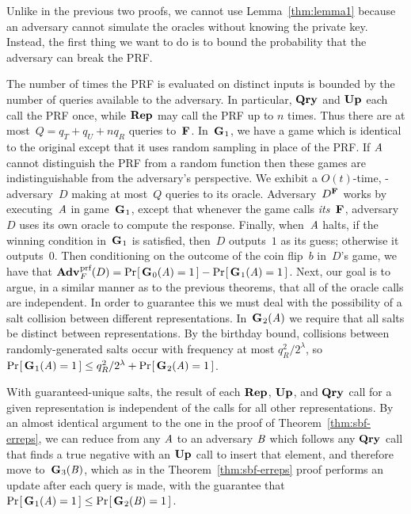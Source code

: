 Unlike in the previous two proofs, we cannot use Lemma~\ref{thm:lemma1} because
an adversary cannot simulate the oracles without knowing the private key. Instead,
the first thing we
want to do is to bound the probability that the adversary can break the PRF.

The number of times the PRF is evaluated on distinct inputs is bounded by the
number of queries available to the adversary. In particular, $\textup{\textbf{Qry}}\hspace{0.5pt}$ and $\textup{\textbf{Up}}\hspace{0.5pt}$
each call the PRF once, while $\textup{\textbf{Rep}}\hspace{0.5pt}$ may call the PRF up to $n$ times. Thus
there are at most~$Q = q_T + q_U + nq_R$
queries to~$\textup{\textbf{F}}\hspace{0.5pt}$.
%
In~$\textup{\textbf{G}}\hspace{0.5pt}_1$, we have a game which is identical to the original except that it
uses
random sampling in place of the PRF. If $\mathit{A}$ cannot distinguish the PRF from
a random function then these games are indistinguishable from the adversary's
perspective.
%
We exhibit a $O(t)$-time, \prf-adversary~$D$ making at most~$Q$ queries to its
oracle. Adversary~$D^{\textup{\textbf{F}}\hspace{0.5pt}}$ works by executing~$\mathit{A}$ in game~$\textup{\textbf{G}}\hspace{0.5pt}_1$, except
that whenever the game calls \emph{its}~$\textup{\textbf{F}}\hspace{0.5pt}$, adversary~$D$ uses its
own oracle to compute the response.
%
Finally, when~$\mathit{A}$ halts, if the winning condition in~$\textup{\textbf{G}}\hspace{0.5pt}_1$ is satisfied,
then~$D$ outputs~$1$ as its guess; otherwise it outputs~$0$.
%
Then conditioning on the outcome of the coin flip~$b$ in~$D$'s game, we have that
$\Adv{\prf}_F(D) = \Prob{\game_0(\advA)=1} - \Prob{\game_1(\advA)=1}$.
%
Next, our goal is to argue, in a similar manner as to the previous theorems, that all
of the oracle calls are independent. In order to guarantee this we must deal
with the possibility of a salt collision between different representations.
In~$\textup{\textbf{G}}\hspace{0.5pt}_2(\mathit{A})$ we require that all salts be distinct between
representations. By the birthday bound, collisions between randomly-generated
salts occur with frequency at most $q_R^2/2^\lambda$, so $\Pr\hspace{-1pt}\left[\,\textup{\textbf{G}}\hspace{0.5pt}_1(\mathit{A}) =
1\,\right] \le q_R^2/2^\lambda + \Pr\hspace{-1pt}\left[\,\textup{\textbf{G}}\hspace{0.5pt}_2(\mathit{A}) = 1\,\right]$.

With guaranteed-unique salts, the result of each $\textup{\textbf{Rep}}\hspace{0.5pt}$, $\textup{\textbf{Up}}\hspace{0.5pt}$, and $\textup{\textbf{Qry}}\hspace{0.5pt}$
call for a given representation is independent of the calls for all other
representations. By an almost identical argument to the one in the proof of
Theorem~\ref{thm:sbf-erreps}, we can reduce from any $\mathit{A}$ to an adversary
$\mathit{B}$ which follows any $\textup{\textbf{Qry}}\hspace{0.5pt}$ call that finds a true negative with an
$\textup{\textbf{Up}}\hspace{0.5pt}$ call to insert that element, and therefore move to~$\textup{\textbf{G}}\hspace{0.5pt}_3(\mathit{B})$,
which as in the Theorem~\ref{thm:sbf-erreps} proof performs an update after each
query is made, with the guarantee that $\Pr\hspace{-1pt}\left[\,\textup{\textbf{G}}\hspace{0.5pt}_1(\mathit{A}) = 1\,\right] \le
\Pr\hspace{-1pt}\left[\,\textup{\textbf{G}}\hspace{0.5pt}_2(\mathit{B}) = 1\,\right]$.

